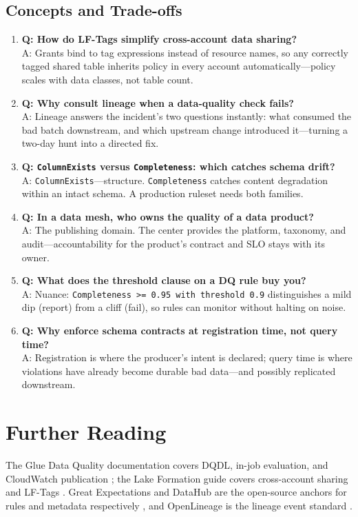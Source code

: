\subsection{Concepts and Trade-offs}
\begin{enumerate}
    \item \textbf{Q: How do LF-Tags simplify cross-account data sharing?}\\
    A: Grants bind to tag expressions instead of resource names, so any correctly tagged shared table inherits policy in every account automatically---policy scales with data classes, not table count.
    \item \textbf{Q: Why consult lineage when a data-quality check fails?}\\
    A: Lineage answers the incident's two questions instantly: what consumed the bad batch downstream, and which upstream change introduced it---turning a two-day hunt into a directed fix.
    \item \textbf{Q: \texttt{ColumnExists} versus \texttt{Completeness}: which catches schema drift?}\\
    A: \texttt{ColumnExists}---structure. \texttt{Completeness} catches content degradation within an intact schema. A production ruleset needs both families.
    \item \textbf{Q: In a data mesh, who owns the quality of a data product?}\\
    A: The publishing domain. The center provides the platform, taxonomy, and audit---accountability for the product's contract and SLO stays with its owner.
    \item \textbf{Q: What does the threshold clause on a DQ rule buy you?}\\
    A: Nuance: \texttt{Completeness >= 0.95 with threshold 0.9} distinguishes a mild dip (report) from a cliff (fail), so rules can monitor without halting on noise.
    \item \textbf{Q: Why enforce schema contracts at registration time, not query time?}\\
    A: Registration is where the producer's intent is declared; query time is where violations have already become durable bad data---and possibly replicated downstream.
\end{enumerate}

\section{Further Reading}
The Glue Data Quality documentation covers DQDL, in-job evaluation, and CloudWatch publication \cite{awsGlueDataQualityDocs}; the Lake Formation guide covers cross-account sharing and LF-Tags \cite{awsLakeFormationDocs}. Great Expectations and DataHub are the open-source anchors for rules and metadata respectively \cite{greatExpectations,dataHubProject}, and OpenLineage is the lineage event standard \cite{openLineage}.

